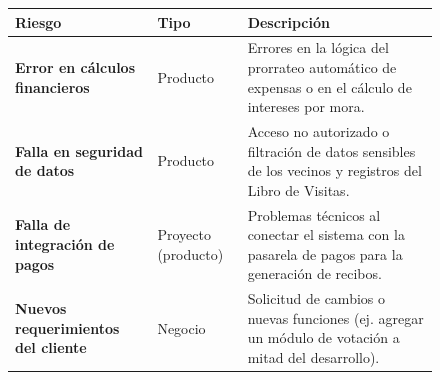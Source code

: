 \begin{figure}[H]
    \centering
    \begin{tabularx}{\textwidth}{|p{5cm}|p{3cm}|X|}
    \hline
            \textbf{Riesgo} 
        
        & 
        
            \textbf{Tipo} 
        
        & 
        
            \textbf{Descripción} 
        
    \\ \hline
    
            \textbf{Error en cálculos financieros} 
        
        & 
        
            Producto 
        
        & 
        
            Errores en la lógica del prorrateo automático de expensas o en el cálculo de intereses por mora. 
        
    \\ \hline
    
            \textbf{Falla en seguridad de datos} 
        
        & 
        
            Producto 
        
        & 
        
            Acceso no autorizado o filtración de datos sensibles de los vecinos y registros del Libro de Visitas. 
        
    \\ \hline
    
                \textbf{Falla de integración de pagos} 
        
        & 
        
            Proyecto (producto) 
        
        & 
        
            Problemas técnicos al conectar el sistema con la pasarela de pagos para la generación de recibos. 
        
    \\ \hline
    
            \textbf{Nuevos requerimientos del cliente} 
        
        & 
        
            Negocio 
        
        & 
        
            Solicitud de cambios o nuevas funciones (ej. agregar un módulo de votación a mitad del desarrollo). 
        

\end{tabularx}
\end{figure}
